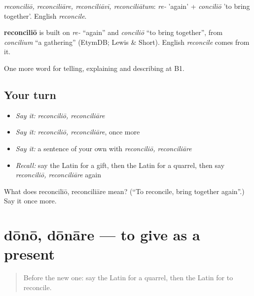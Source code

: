 \emph{reconciliō, reconciliāre, reconciliāvī, reconciliātum}: \emph{re-} 'again' + \emph{conciliō} 'to bring together'. English \emph{reconcile}.

\begin{cousinweb}
\textbf{reconciliō} is built on \emph{re-} \textquotedblleft{}again\textquotedblright{} and \emph{conciliō} \textquotedblleft{}to bring together\textquotedblright{}, from \emph{concilium} \textquotedblleft{}a gathering\textquotedblright{} (EtymDB; Lewis \& Short). English \emph{reconcile} comes from it.
\end{cousinweb}

\begin{grammarlens}[title={What you've built}]
One more word for telling, explaining and describing at B1.
\end{grammarlens}

\subsection*{Your turn}
\begin{itemize}
\raggedright
  \item \emph{Say it:} \emph{reconciliō, reconciliāre}
  \item \emph{Say it:} \emph{reconciliō, reconciliāre}, once more
  \item \emph{Say it:} a sentence of your own with \emph{reconciliō, reconciliāre}
  \item \emph{Recall:} say the Latin for a gift, then the Latin for a quarrel, then say \emph{reconciliō, reconciliāre} again
\end{itemize}

\begin{tcolorbox}[breakable,colback=teal!4,colframe=teal!35!black,title={Before you move on}]
What does reconciliō, reconciliāre mean? (\textquotedblleft{}To reconcile, bring together again\textquotedblright{}.) Say it once more.
\end{tcolorbox}
\section[dōnō, dōnāre]{dōnō, dōnāre — to give as a present}

\label{lesson:LA-C537-dono}



\begin{quote}
Before the new one: say the Latin for a quarrel, then the Latin for to reconcile.
\end{quote}

